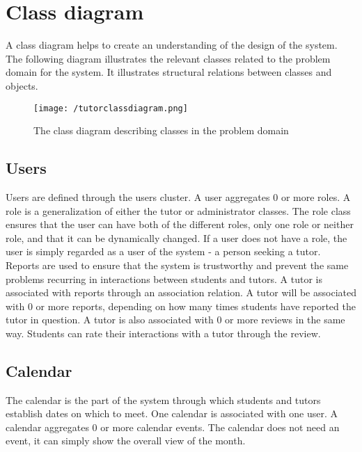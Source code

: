 \section{Class diagram}
A class diagram helps to create an understanding of the design of the system.
The following diagram illustrates the relevant classes related to the problem domain for the system.
It illustrates structural relations between classes and objects.

\begin{figure}[H]
    \texttt{[image: /tutorclassdiagram.png]}
     \caption{The class diagram describing classes in the problem domain}
     \label{fig:class-diagram}
 \end{figure}

\subsection{Users}
Users are defined through the users cluster.
A user aggregates 0 or more roles. 
A role is a generalization of either the tutor or administrator classes. 
The role class ensures that the user can have both of the different roles, only one role or neither role, and that it can be dynamically changed.
If a user does not have a role, the user is simply regarded as a user of the system - a person seeking a tutor. 
Reports are used to ensure that the system is trustworthy and prevent the same problems recurring in interactions between students and tutors.
A tutor is associated with reports through an association relation.
A tutor will be associated with 0 or more reports, depending on how many times students have reported the tutor in question.
A tutor is also associated with 0 or more reviews in the same way. 
Students can rate their interactions with a tutor through the review.

\subsection{Calendar}
The calendar is the part of the system through which students and tutors establish dates on which to meet. 
One calendar is associated with one user.
A calendar aggregates 0 or more calendar events. 
The calendar does not need an event, it can simply show the overall view of the month.

